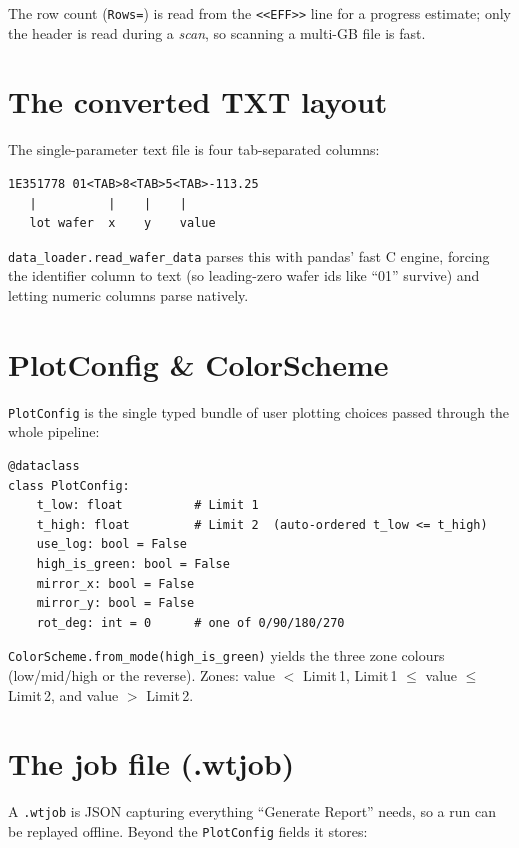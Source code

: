 \documentclass[11pt,a4paper]{report}
\newcommand{\code}[1]{\texttt{#1}}
\begin{document}
The row count (\code{Rows=}) is read from the \code{<<EFF>>} line for a progress
estimate; only the header is read during a \emph{scan}, so scanning a multi-GB
file is fast.

\section{The converted TXT layout}
The single-parameter text file is four tab-separated columns:
\begin{lstlisting}[style=plain]
1E351778 01<TAB>8<TAB>5<TAB>-113.25
   |          |    |    |
   lot wafer  x    y    value
\end{lstlisting}
\code{data\_loader.read\_wafer\_data} parses this with pandas' fast C engine,
forcing the identifier column to text (so leading-zero wafer ids like ``01''
survive) and letting numeric columns parse natively.

\section{PlotConfig \& ColorScheme}
\code{PlotConfig} is the single typed bundle of user plotting choices passed
through the whole pipeline:

\begin{lstlisting}
@dataclass
class PlotConfig:
    t_low: float          # Limit 1
    t_high: float         # Limit 2  (auto-ordered t_low <= t_high)
    use_log: bool = False
    high_is_green: bool = False
    mirror_x: bool = False
    mirror_y: bool = False
    rot_deg: int = 0      # one of 0/90/180/270
\end{lstlisting}

\code{ColorScheme.from\_mode(high\_is\_green)} yields the three zone colours
(\textcolor{zgreen}{low}/\textcolor{zamber}{mid}/\textcolor{zred}{high} or the
reverse). Zones: value $<$ Limit\,1, Limit\,1 $\le$ value $\le$ Limit\,2, and
value $>$ Limit\,2.

\section{The job file (.wtjob)}
A \code{.wtjob} is JSON capturing everything ``Generate Report'' needs, so a run
can be replayed offline. Beyond the \code{PlotConfig} fields it stores:
\end{document}
